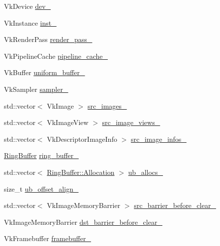 \begin{DoxyCompactItemize}
\item 
Vk\+Device \mbox{\hyperlink{namespacehwcomposer_a2f412e9caa9936e522c2a7db388c57ec}{dev\+\_\+}}
\item 
Vk\+Instance \mbox{\hyperlink{namespacehwcomposer_a4ca6f785a435fe182d864903004ba79c}{inst\+\_\+}}
\item 
Vk\+Render\+Pass \mbox{\hyperlink{namespacehwcomposer_a4d9a582f332eed1a524e91fce91d09c2}{render\+\_\+pass\+\_\+}}
\item 
Vk\+Pipeline\+Cache \mbox{\hyperlink{namespacehwcomposer_af9df829b7f8d0582f51a2b9c77c477c3}{pipeline\+\_\+cache\+\_\+}}
\item 
Vk\+Buffer \mbox{\hyperlink{namespacehwcomposer_a7f1b6f91ef21a2ba46ffc976c81d70ff}{uniform\+\_\+buffer\+\_\+}}
\item 
Vk\+Sampler \mbox{\hyperlink{namespacehwcomposer_a35eda7e12c33bc7d611bdc19b4eee4bb}{sampler\+\_\+}}
\item 
std\+::vector$<$ Vk\+Image $>$ \mbox{\hyperlink{namespacehwcomposer_a5c7514b014dac4a93f7eee8f538a433d}{src\+\_\+images\+\_\+}}
\item 
std\+::vector$<$ Vk\+Image\+View $>$ \mbox{\hyperlink{namespacehwcomposer_ac0909ed99a987099fc76a01e0e7e6b1d}{src\+\_\+image\+\_\+views\+\_\+}}
\item 
std\+::vector$<$ Vk\+Descriptor\+Image\+Info $>$ \mbox{\hyperlink{namespacehwcomposer_a7eca0feeff5b3292a308fc67388f1497}{src\+\_\+image\+\_\+infos\+\_\+}}
\item 
\mbox{\hyperlink{classhwcomposer_1_1RingBuffer}{Ring\+Buffer}} \mbox{\hyperlink{namespacehwcomposer_a2fbb38712cfea2b605d1beeac8e33990}{ring\+\_\+buffer\+\_\+}}
\item 
std\+::vector$<$ \mbox{\hyperlink{classhwcomposer_1_1RingBuffer_1_1Allocation}{Ring\+Buffer\+::\+Allocation}} $>$ \mbox{\hyperlink{namespacehwcomposer_a60b6b92596cbf14268f77d148d32c042}{ub\+\_\+allocs\+\_\+}}
\item 
size\+\_\+t \mbox{\hyperlink{namespacehwcomposer_a9833bb55d7e347e3d50e2f0f24ad3121}{ub\+\_\+offset\+\_\+align\+\_\+}}
\item 
std\+::vector$<$ Vk\+Image\+Memory\+Barrier $>$ \mbox{\hyperlink{namespacehwcomposer_af73e429b9c07e50ab625f7f54205af77}{src\+\_\+barrier\+\_\+before\+\_\+clear\+\_\+}}
\item 
Vk\+Image\+Memory\+Barrier \mbox{\hyperlink{namespacehwcomposer_aa28a44748c7fc9613da282bc580cb005}{dst\+\_\+barrier\+\_\+before\+\_\+clear\+\_\+}}
\item 
Vk\+Framebuffer \mbox{\hyperlink{namespacehwcomposer_a9761a93547da000b91c035dbfeef55df}{framebuffer\+\_\+}}
\end{DoxyCompactItemize}


